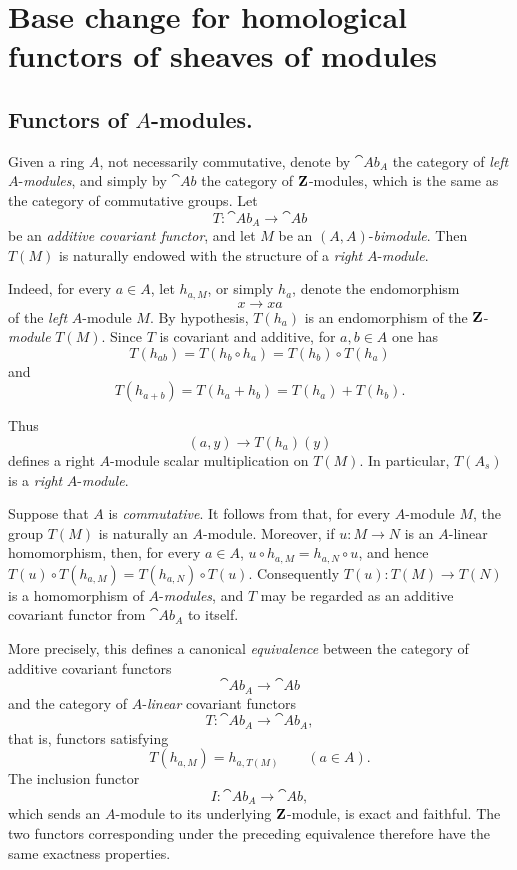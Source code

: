 \section{Base change for homological functors of sheaves of modules}
\label{section:III.7}


\subsection{Functors of $A$-modules.}
\label{subsection:III.7.1}

\begin{env}[7.1.1]
\label{III.7.1.1}
Given a ring $A$, not necessarily commutative, denote by
$\cat{Ab}_A$ the category of \emph{left} $A$-\emph{modules}, and simply by
$\cat{Ab}$ the category of $\mathbf{Z}$-modules, which is the same
as the category of commutative groups.  Let
\[
  T:\cat{Ab}_A\longrightarrow\cat{Ab}
\]
be an \emph{additive covariant functor}, and let $M$ be an
$(A,A)$-\emph{bimodule}.  Then $T(M)$ is naturally endowed with the
structure of a \emph{right} $A$-\emph{module}.

Indeed, for every $a\in A$, let $h_{a,M}$, or simply $h_a$,
denote the endomorphism
\[
  x\to xa
\]
of the \emph{left} $A$-module $M$.  By hypothesis, $T(h_a)$ is an
endomorphism of the $\mathbf{Z}$-\emph{module} $T(M)$.  Since $T$ is
covariant and additive, for $a,b\in A$ one has
\[
  T(h_{ab})
  =
  T(h_b\circ h_a)
  =
  T(h_b)\circ T(h_a)
\]
and
\[
  T(h_{a+b})
  =
  T(h_a+h_b)
  =
  T(h_a)+T(h_b).
\]
\par\medskip\noindent Thus
\[
  (a,y)\to T(h_a)(y)
\]
defines a right $A$-module scalar multiplication on $T(M)$.
In particular, $T(A_s)$ is a \emph{right} $A$-\emph{module}.
\end{env}

\begin{env}[7.1.2]
\label{III.7.1.2}
Suppose that $A$ is \emph{commutative}.  It follows from
 that, for every $A$-module $M$, the group
$T(M)$ is naturally an $A$-module.  Moreover, if
$u:M\to N$ is an $A$-linear homomorphism, then, for every
$a\in A$, $u\circ h_{a,M}=h_{a,N}\circ u$,
and hence $T(u)\circ T(h_{a,M})
=
T(h_{a,N})\circ T(u)$.
Consequently $T(u):T(M)\to T(N)$ is a homomorphism of
$A$-\emph{modules}, and $T$ may be
regarded as an additive covariant functor from $\cat{Ab}_A$ to
itself.

More precisely, this defines a canonical \emph{equivalence} between
the category of additive covariant functors
\[
  \cat{Ab}_A\longrightarrow\cat{Ab}
\]
and the category of $A$-\emph{linear} covariant functors
\[
  T:\cat{Ab}_A\longrightarrow\cat{Ab}_A,
\]
that is, functors satisfying
\[
  T(h_{a,M})=h_{a,T(M)}
  \qquad(a\in A).
\]
The inclusion functor
\[
  I:\cat{Ab}_A\longrightarrow\cat{Ab},
\]
which sends an $A$-module to its underlying $\mathbf{Z}$-module, is
exact and faithful.  The two functors corresponding under the
preceding equivalence therefore have the same exactness
properties.
\end{env}

